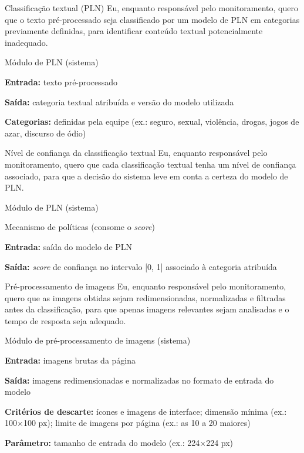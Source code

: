 \documentclass[
    12pt,           %
    oneside,        %
    a4paper,        %
    chapter=TITLE,  %
    english,        %
    brazil          %
]{abntex2}
\begin{document}
{Classificação textual (PLN)}
{Eu, enquanto responsável pelo monitoramento, quero que o texto pré-processado seja classificado por um modelo de PLN em categorias previamente definidas, para identificar conteúdo textual potencialmente inadequado.}
{\begin{dadoslista}
\item Módulo de PLN (sistema)
\end{dadoslista}}
{\begin{dadoslista}
\item \textbf{Entrada:} texto pré-processado
\item \textbf{Saída:} categoria textual atribuída e versão do modelo utilizada
\item \textbf{Categorias:} definidas pela equipe (ex.: seguro, sexual, violência, drogas, jogos de azar, discurso de ódio)
\end{dadoslista}}

{Nível de confiança da classificação textual}
{Eu, enquanto responsável pelo monitoramento, quero que cada classificação textual tenha um nível de confiança associado, para que a decisão do sistema leve em conta a certeza do modelo de PLN.}
{\begin{dadoslista}
\item Módulo de PLN (sistema)
\item Mecanismo de políticas (consome o \textit{score})
\end{dadoslista}}
{\begin{dadoslista}
\item \textbf{Entrada:} saída do modelo de PLN
\item \textbf{Saída:} \textit{score} de confiança no intervalo [0, 1] associado à categoria atribuída
\end{dadoslista}}

{Pré-processamento de imagens}
{Eu, enquanto responsável pelo monitoramento, quero que as imagens obtidas sejam redimensionadas, normalizadas e filtradas antes da classificação, para que apenas imagens relevantes sejam analisadas e o tempo de resposta seja adequado.}
{\begin{dadoslista}
\item Módulo de pré-processamento de imagens (sistema)
\end{dadoslista}}
{\begin{dadoslista}
\item \textbf{Entrada:} imagens brutas da página
\item \textbf{Saída:} imagens redimensionadas e normalizadas no formato de entrada do modelo
\item \textbf{Critérios de descarte:} ícones e imagens de interface; dimensão mínima (ex.: 100$\times$100 px); limite de imagens por página (ex.: as 10 a 20 maiores)
\item \textbf{Parâmetro:} tamanho de entrada do modelo (ex.: 224$\times$224 px)
\end{dadoslista}}
\end{document}

